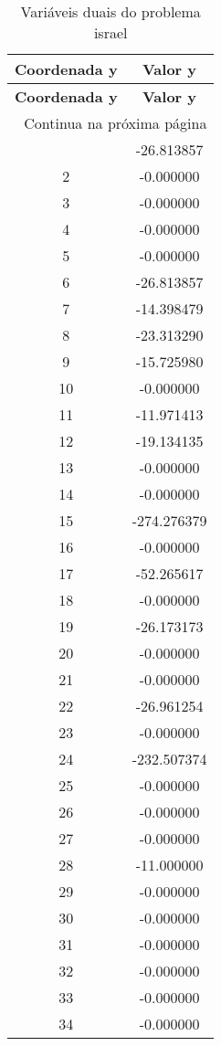 \documentclass[12pt]{article}
\begin{document}
\begin{longtable}{@{}cc@{}}
\caption{Variáveis duais do problema israel} \\
\toprule
\textbf{Coordenada y} & \textbf{Valor y} \\
\midrule
\endfirsthead

\toprule
\textbf{Coordenada y} & \textbf{Valor y} \\
\midrule
\endhead

\midrule \multicolumn{2}{r}{{Continua na próxima página}} \\ \midrule
\endfoot

\bottomrule
\endlastfoot
1 & -26.813857 \\
2 & -0.000000 \\
3 & -0.000000 \\
4 & -0.000000 \\
5 & -0.000000 \\
6 & -26.813857 \\
7 & -14.398479 \\
8 & -23.313290 \\
9 & -15.725980 \\
10 & -0.000000 \\
11 & -11.971413 \\
12 & -19.134135 \\
13 & -0.000000 \\
14 & -0.000000 \\
15 & -274.276379 \\
16 & -0.000000 \\
17 & -52.265617 \\
18 & -0.000000 \\
19 & -26.173173 \\
20 & -0.000000 \\
21 & -0.000000 \\
22 & -26.961254 \\
23 & -0.000000 \\
24 & -232.507374 \\
25 & -0.000000 \\
26 & -0.000000 \\
27 & -0.000000 \\
28 & -11.000000 \\
29 & -0.000000 \\
30 & -0.000000 \\
31 & -0.000000 \\
32 & -0.000000 \\
33 & -0.000000 \\
34 & -0.000000 \\

\end{longtable}
\end{document}
